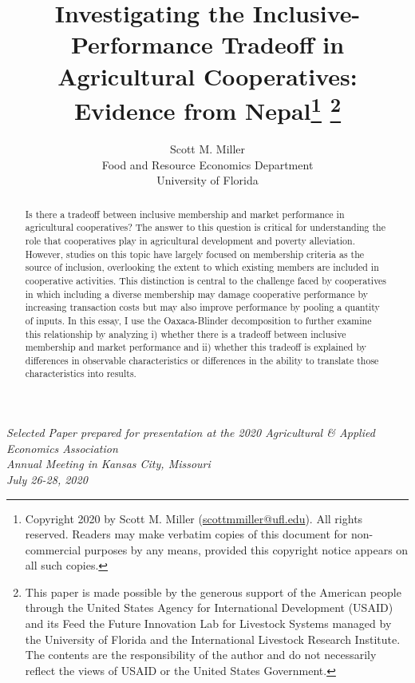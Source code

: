 \documentclass[11pt]{article}
\begin{document}



\title{Investigating the Inclusive-Performance Tradeoff in Agricultural Cooperatives: Evidence from Nepal\thanks{Copyright 2020 by Scott M. Miller (\href{scottmmiller@ufl.edu}{scottmmiller@ufl.edu}). All rights reserved. Readers may make verbatim copies of this document for non-commercial purposes by any means, provided this copyright notice appears on all such copies.} \thanks{This paper is made possible by the generous support of the American people through the United States Agency for International Development (USAID) and its Feed the Future Innovation Lab for Livestock Systems managed by the University of Florida and the International Livestock Research Institute. The contents are the responsibility of the author and do not necessarily reflect the views of USAID or the United States Government.}}

\author{Scott M. Miller \\ Food and Resource Economics Department \\ University of Florida}
\date{}

\sloppy
\maketitle

\vspace{.5cm}
\begin{center}
\textit{Selected Paper prepared for presentation at the 2020 Agricultural \& Applied Economics Association \\ Annual Meeting in Kansas City, Missouri \\ July 26-28, 2020}  
\end{center}


\vspace{.5cm}

\begin{abstract}
Is there a tradeoff between inclusive membership and market performance in agricultural cooperatives? The answer to this question is critical for understanding the role that cooperatives play in agricultural development and poverty alleviation. However, studies on this topic have largely focused on membership criteria as the source of inclusion, overlooking the extent to which existing members are included in cooperative activities. This distinction is central to the challenge faced by cooperatives in which including a diverse membership may damage cooperative performance by increasing transaction costs but may also improve performance by pooling a quantity of inputs. In this essay, I use the Oaxaca-Blinder decomposition to further examine this relationship by analyzing i) whether there is a tradeoff between inclusive membership and market performance and ii) whether this tradeoff is explained by differences in observable characteristics or differences in the ability to translate those characteristics into results.
\end{abstract}
\end{document}
